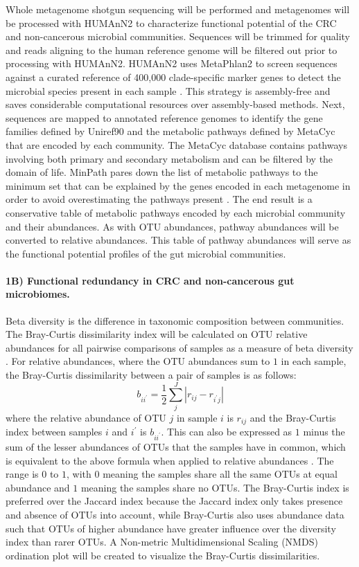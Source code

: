 \documentclass[11pt]{article}
\begin{document}
Whole metagenome shotgun sequencing will be performed and metagenomes will be processed with HUMAnN2 \cite{franzosa_species-level_2018} to characterize functional potential of the CRC and non-cancerous microbial communities.
Sequences will be trimmed for quality and reads aligning to the human reference genome will be filtered out prior to processing with HUMAnN2.
HUMAnN2 uses MetaPhlan2 to screen sequences against a curated reference of 400,000 clade-specific marker genes to detect the microbial species present in each sample \cite{segata_metagenomic_2012}.
This strategy is assembly-free and saves considerable computational resources over assembly-based methods.
Next, sequences are mapped to annotated reference genomes to identify the gene families defined by Uniref90 and the metabolic pathways defined by MetaCyc \cite{caspi_metacyc_2018} that are encoded by each community.
The MetaCyc database contains pathways involving both primary and secondary metabolism and can be filtered by the domain of life.
MinPath pares down the list of metabolic pathways to the minimum set that can be explained by the genes encoded in each metagenome in order to avoid overestimating the pathways present \cite{ye_parsimony_2009}.
The end result is a conservative table of metabolic pathways encoded by each microbial community and their abundances.
As with OTU abundances, pathway abundances will be converted to relative abundances.
This table of pathway abundances will serve as the functional potential profiles of the gut microbial communities.


\paragraph{1B) Functional redundancy in CRC and non-cancerous gut microbiomes.}

Beta diversity is the difference in taxonomic composition between communities.
The Bray-Curtis dissimilarity index will be calculated on OTU relative abundances for all pairwise comparisons of samples as a measure of beta diversity \cite{bray_ordination_1957}.
For relative abundances, where the OTU abundances sum to $1$ in each sample, the Bray-Curtis dissimilarity between a pair of samples is as follows:
$$b_{i i^\prime } = \frac{1}{2} \sum_{j}^J | r_{ij} - r_{i^\prime j} |$$
where the relative abundance of OTU $j$ in sample $i$ is $r_{ij}$ and the Bray-Curtis index between samples $i$ and $i^\prime$ is $b_{i i^\prime }$.
This can also be expressed as $1$ minus the sum of the lesser abundances of OTUs that the samples have in common, which is equivalent to the above formula when applied to relative abundances \cite{greenacre_multivariate_2014}.
The range is $0$ to $1$, with $0$ meaning the samples share all the same OTUs at equal abundance and $1$ meaning the samples share no OTUs.
The Bray-Curtis index is preferred over the Jaccard index because the Jaccard index only takes presence and absence of OTUs into account, while Bray-Curtis also uses abundance data such that OTUs of higher abundance have greater influence over the diversity index than rarer OTUs.
A Non-metric Multidimensional Scaling (NMDS) ordination plot will be created to visualize the Bray-Curtis dissimilarities.
\end{document}

